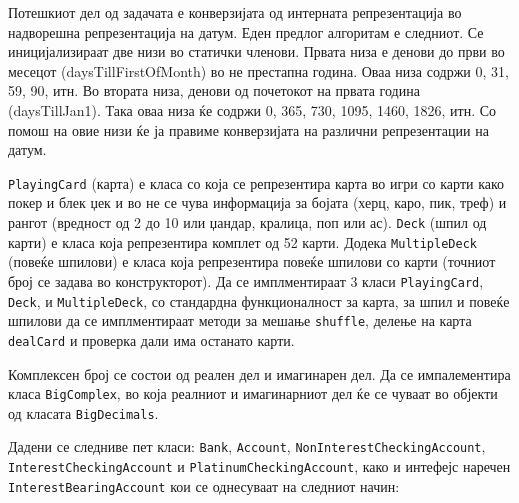 \begin{questions}
Потешкиот дел од задачата е конверзијата од интерната репрезентација во
надворешна репрезентација на датум. Еден предлог алгоритам е следниот. Се
иницијализираат две низи во статички членови. Првата низа е денови до први во
месецот (daysTillFirstOfMonth) во не престапна година. Оваа низа содржи 0, 31,
59, 90, итн. Во втората низа, денови од почетокот на првата година
(daysTillJan1). Така оваа низа ќе содржи 0, 365, 730, 1095, 1460, 1826, итн. Со
помош на овие низи ќе ја правиме конверзијата на различни репрезентации на
датум.



\question
\texttt{PlayingCard} (карта) е класа со која се репрезентира карта во игри со
карти како покер и блек џек и во не се чува информација за бојата (херц, каро, пик, треф) и
рангот (вредност од 2 до 10 или џандар, кралица, поп или ас). \texttt{Deck}
(шпил од карти) е класа која репрезентира комплет од 52 карти. Додека
\texttt{MultipleDeck} (повеќе шпилови) е класа која репрезентира повеќе шпилови
со карти (точниот број се задава во конструкторот). Да се имплментираат 3 класи
\texttt{PlayingCard}, \texttt{Deck}, и \texttt{MultipleDeck}, со стандардна
функционалност за карта, за шпил и повеќе шпилови да се имплментираат методи за
мешање \texttt{shuffle}, делење на карта  \texttt{dealCard} и проверка дали има
останато карти.





\question
Комплексен број се состои од реален дел и имагинарен дел. Да се импалементира
класа \texttt{BigComplex}, во која реалниот и имагинарниот дел ќе се чуваат во
објекти од класата \texttt{BigDecimals}.



\question
Дадени се следниве пет класи: \texttt{Bank}, \texttt{Account},
\texttt{NonInterestCheckingAccount}, \texttt{InterestCheckingAccount} и
\texttt{PlatinumCheckingAccount}, како и интефејс наречен
\texttt{InterestBearingAccount} кои се однесуваат на следниот начин:


\end{questions}
